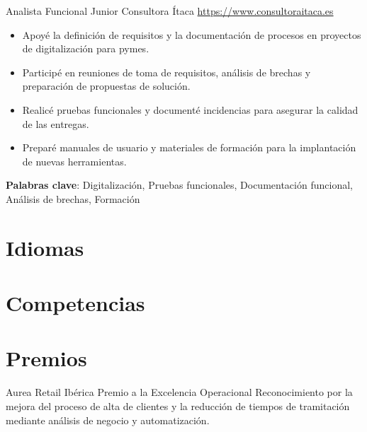 \documentclass[a4paper, serif, 10pt]{moderncv}
\begin{document}
        {Analista Funcional Junior}
        {Consultora Ítaca}
        {\url{https://www.consultoraitaca.es}}
        {}
        {\begin{itemize}
\item Apoyé la definición de requisitos y la documentación de procesos en proyectos de digitalización para pymes.
\item Participé en reuniones de toma de requisitos, análisis de brechas y preparación de propuestas de solución.
\item Realicé pruebas funcionales y documenté incidencias para asegurar la calidad de las entregas.
\item Preparé manuales de usuario y materiales de formación para la implantación de nuevas herramientas.
\end{itemize}
\textbf{Palabras clave}: Digitalización, Pruebas funcionales, Documentación funcional, Análisis de brechas, Formación}
\section{Idiomas}

\section{Competencias}

\section{Premios}

        {Aurea Retail Ibérica}
        {Premio a la Excelencia Operacional}
        {}
        {}
        {Reconocimiento por la mejora del proceso de alta de clientes y la reducción de tiempos de tramitación mediante análisis de negocio y automatización.}
\end{document}
